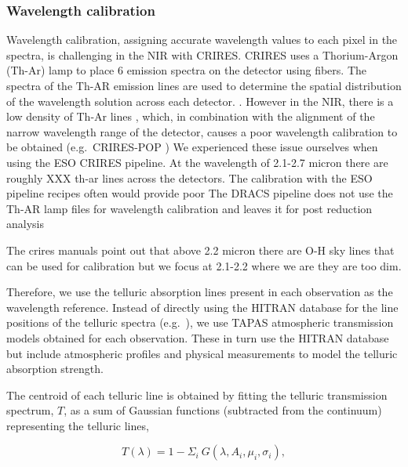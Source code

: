 \subsubsection{Wavelength calibration}
\label{subsec:wave_cal}
Wavelength calibration, assigning accurate wavelength values to each pixel in the spectra, is challenging in the NIR with CRIRES. CRIRES uses a Thorium-Argon (Th-Ar) lamp to place 6 emission spectra on the detector using fibers. The spectra of the Th-AR emission lines are used to determine the spatial distribution of the wavelength solution across each detector. . However in the NIR, there is a low density of Th-Ar lines \citep{kerber_laboratory_2009}, which, in combination with the alignment of the narrow wavelength range of the detector, causes a poor wavelength calibration to be obtained (e.g.\ CRIRES-POP \citep{nicholls_crirespop_2017})
We experienced these issue ourselves when using the ESO CRIRES pipeline. At the wavelength of 2.1-2.7 micron there are roughly XXX th-ar lines across the detectors.
The calibration with the ESO pipeline recipes often would provide poor The DRACS pipeline does not use the Th-AR lamp files for wavelength calibration and leaves it for post reduction analysis

The crires manuals point out that above 2.2 micron there are O-H sky lines that can be used for calibration but we focus at 2.1-2.2 where we are they are too dim.
 
Therefore, we use the telluric absorption lines present in each observation as the wavelength reference. Instead of directly using the HITRAN database \citep{rothman_hitran2012_2013} for the line positions of the telluric spectra (e.g.~\citep{brogi_signature_2012,brogi_carbon_2014,dekok_detection_2013}), we use TAPAS atmospheric transmission models \citep{bertaux_tapas_2014} obtained for each observation. These in turn use the HITRAN database but include atmospheric profiles and physical measurements to model the telluric absorption strength.

The centroid of each telluric line is obtained by fitting the telluric transmission spectrum, \(T \), as a sum of Gaussian functions (subtracted from the continuum) representing the telluric lines,

\begin{equation}
T(\lambda) = 1 - {\Sigma}_{i}\ G(\lambda, A_{i}, {\mu}_{i}, {\sigma}_{i}),
\end{equation}


